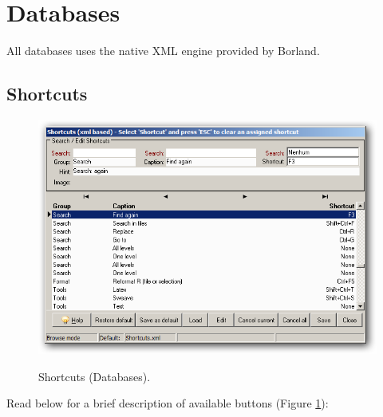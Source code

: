 
\hypertarget{working_databases}{}
\section{Databases}

All databases uses the native XML engine provided by Borland.

\subsection{Shortcuts}

\begin{figure}[h!]
  \includegraphics[scale=0.35]{./res/shortcuts_dlg.png}\\
  \caption{Shortcuts (Databases).}
  \label{fig:shortcuts_dlg_2}
\end{figure}

Read below for a brief description of available buttons (Figure \ref{fig:shortcuts_dlg_2}):

